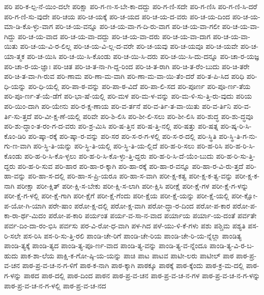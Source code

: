 {ಪರಿ
ಪರಿ-ಕ-ಲ್ಪ-ನೆ-ಯಿಂ-ದಲೇ
ಪರಿಕ್ಷಾ
ಪರಿ-ಗ-ಣ-ಸ-ಬೇ-ಕಾ-ದದ್ದು
ಪರಿ-ಗ-ಣಿ-ಸದೇ
ಪರಿ-ಗ-ಣಿಸಿ
ಪರಿ-ಗ-ಣಿ-ಸಿ-ದರೆ
ಪರಿ-ಗ-ಣಿ-ಸು-ವುದೇ
ಪರಿ-ಚಯ
ಪರಿ-ಚ-ಯಕ್ಕೆ
ಪರಿ-ಚ-ಯದ
ಪರಿ-ಚ-ಯ-ದ-ವರು
ಪರಿ-ಚ-ಯ-ದಿಂದ
ಪರಿ-ಚ-ಯ-ಮಾ-ಡಿ-ಕೊ-ಳ್ಳು-ವಾಗ
ಪರಿ-ಚ-ಯ-ವನ್ನೂ
ಪರಿ-ಚ-ಯ-ವಾ-ಗ-ದಿ-ರು-ವಾಗ
ಪರಿ-ಚ-ಯ-ವಾ-ಗಲೀ
ಪರಿ-ಚ-ಯ-ವಾ-ಗಿದ್ದು
ಪರಿ-ಚ-ಯ-ವಾದ
ಪರಿ-ಚ-ಯ-ವಾ-ದದ್ದು
ಪರಿ-ಚ-ಯ-ವಾ-ದರು
ಪರಿ-ಚ-ಯ-ವಾ-ದಾಗ
ಪರಿ-ಚ-ಯ-ವಾ-ಯಿತು
ಪರಿ-ಚ-ಯ-ವಿ-ರ-ಲಿಲ್ಲ
ಪರಿ-ಚ-ಯ-ವಿ-ಲ್ಲ-ದ-ವರೇ
ಪರಿ-ಚ-ಯವು
ಪರಿ-ಚ-ಯವೂ
ಪರಿ-ಚ-ಯವೇ
ಪರಿ-ಚ-ಯಾ-ತ್ಮಕ
ಪರಿ-ಚ-ಯಿಸಿ
ಪರಿ-ಚ-ಯಿ-ಸಿ-ಕೊಂಡು
ಪರಿ-ಚ-ಯಿ-ಸಿ-ದರು
ಪರಿ-ಚ-ಯಿ-ಸಿ-ದು-ದನ್ನೂ
ಪರಿ-ಚಾ-ರ-ಯಜ್ಞ
ಪರಿ-ಚಾ-ರ-ಯ-ಜ್ಞಾಃ
ಪರಿ-ಚಿತ
ಪರಿ-ಚಿ-ತ-ನಾ-ಗಿ-ದ್ದ-ರಿಂದ
ಪರಿ-ಚಿ-ತ-ರಾಗಿ
ಪರಿ-ಚಿ-ತ-ರೆಂ-ಬುದು
ಪರಿ-ಚಿ-ತರೇ
ಪರಿ-ಚಿ-ತ-ವಾ-ಗಿ-ರುವ
ಪರಿ-ಣಾಮ
ಪರಿ-ಣಾ-ಮ-ವಾಗಿ
ಪರಿ-ಣಾ-ಮ-ವಾ-ಯಿ-ತೆಂ-ದರೆ
ಪರಿ-ತ-ಪಿ-ಸಿದ
ಪರಿಧಿ
ಪರಿ-ಧಿ-ಯನ್ನು
ಪರಿ-ಧಿ-ಯಲ್ಲಿ
ಪರಿ-ಪಾ-ಠ-ವನ್ನು
ಪರಿ-ಪಾ-ಠ-ವಿದೆ
ಪರಿ-ಪಾ-ಲಿ-ಸದ
ಪರಿ-ಪೂರ್ಣ
ಪರಿ-ಪೂ-ರ್ಣ-ತೆಯ
ಪರಿ-ಪೂ-ರ್ಣ-ತೆ-ಯೆ-ಡೆಗೆ
ಪರಿ-ಭಾ-ಷೆ-ಯಲ್ಲಿ
ಪರಿ-ಮಳ
ಪರಿ-ಮ-ಳ-ವನ್ನು
ಪರಿ-ಮ-ಳಿ-ಸು-ತ್ತಿ-ರು-ವುದು
ಪರಿಯ
ಪರಿ-ಯಿಂ-ದಾಗಿ
ಪರಿ-ಯೇನು
ಪರಿ-ರ-ಕ್ಷ-ಣಾಯ
ಪರಿ-ವ-ರ್ತನೆ
ಪರಿ-ವ-ರ್ತಿ-ತ-ವಾ-ಯಿತು
ಪರಿ-ವ-ರ್ತಿನಿ
ಪರಿ-ವ-ರ್ತಿ-ಸು-ತ್ತದೆ
ಪರಿ-ವೀ-ಕ್ಷ-ಣೆ-ಯಲ್ಲಿ
ಪರಿವೇ
ಪರಿ-ಶಿ-ಲಿಸಿ
ಪರಿ-ಶೀ-ಲಿ-ಸಲು
ಪರಿ-ಶೀ-ಲಿಸಿ
ಪರಿ-ಶುದ್ಧ
ಪರಿ-ಶು-ದ್ಧವೂ
ಪರಿ-ಶು-ದ್ಧಾಂ-ತ-ರಂ-ಗ-ದ-ವರು
ಪರಿ-ಶ್ರ-ಮಿಸಿ
ಪರಿ-ಷ-ತ್ತಿನ
ಪರಿ-ಷ-ತ್ತಿ-ನಲ್ಲಿ
ಪರಿ-ಷತ್ತು
ಪರಿ-ಷತ್ನ
ಪರಿ-ಷ್ಕ-ರಿ-ಸಿ-ಕೊಂ-ಡಿರಿ
ಪರಿ-ಷ್ಕಾ-ರಕ್ಕೆ
ಪರಿ-ಷ್ಕಾ-ರ-ವನ್ನು
ಪರಿ-ಸರ
ಪರಿ-ಸ-ರ-ಗ-ಳಲ್ಲಿ
ಪರಿ-ಸ-ರ-ದಲ್ಲಿ
ಪರಿ-ಸ್ಥಿತಿ
ಪರಿ-ಸ್ಥಿ-ತಿ-ಗ-ನು-ಗು-ಣ-ವಾಗಿ
ಪರಿ-ಸ್ಥಿ-ತಿ-ಯನ್ನು
ಪರಿ-ಸ್ಥಿ-ತಿ-ಯಲ್ಲಿ
ಪರಿ-ಸ್ಥಿ-ತಿ-ಯ-ಲ್ಲಿದೆ
ಪರಿ-ಹ-ರಿ-ಸಲು
ಪರಿ-ಹ-ರಿಸಿ
ಪರಿ-ಹ-ರಿ-ಸಿ-ಕೊಂಡು
ಪರಿ-ಹ-ರಿ-ಸಿ-ಕೊ-ಳ್ಳಲು
ಪರಿ-ಹ-ರಿ-ಸಿ-ಕೊ-ಳ್ಳು-ತ್ತಿ-ದ್ದರು
ಪರಿ-ಹ-ರಿ-ಸಿ-ದೆ-ಯೆಂ-ಬುದು
ಪರಿ-ಹ-ರಿ-ಸು-ತ್ತಿ-ದ್ದರು
ಪರಿ-ಹ-ರಿ-ಸುವ
ಪರಿ-ಹಾರ
ಪರಿ-ಹಾ-ರ-ಕ್ಕಾಗಿ
ಪರಿ-ಹಾ-ರಕ್ಕೆ
ಪರಿ-ಹಾ-ರ-ವನ್ನೂ
ಪರಿ-ಹಾ-ರ-ವಿ-ರು-ತ್ತದೆ
ಪರಿ-ಹಾ-ವನ್ನು
ಪರಿ-ಹಾ-ಸ-ದಲ್ಲಿ
ಪರಿ-ಹಾ-ಸ-ಪ್ರಿ-ಯರೂ
ಪರಿ-ಹಾ-ಸ-ವಾಗಿ
ಪರೀ-ಕ್ಷ-ಕತ್ವ
ಪರೀ-ಕ್ಷ-ಕ-ತ್ವ-ವನ್ನು
ಪರೀ-ಕ್ಷ-ಕ-ನಾಗಿ
ಪರೀಕ್ಷಾ
ಪರೀ-ಕ್ಷಿತ್
ಪರೀ-ಕ್ಷಿ-ಸ-ಬೇಕು
ಪರೀ-ಕ್ಷಿ-ಸ-ಲಾಗಿ
ಪರೀ-ಕ್ಷಿಸಿ
ಪರೀಕ್ಷೆ
ಪರೀ-ಕ್ಷೆ-ಗಳ
ಪರೀ-ಕ್ಷೆ-ಗ-ಳನ್ನು
ಪರೀ-ಕ್ಷೆ-ಗ-ಳಲ್ಲಿ
ಪರೀ-ಕ್ಷೆ-ಗಾಗಿ
ಪರೀ-ಕ್ಷೆಗೆ
ಪರೀ-ಕ್ಷೆ-ಗೆಂದು
ಪರೀ-ಕ್ಷೆಯ
ಪರೀ-ಕ್ಷೆ-ಯನ್ನು
ಪರೀ-ಕ್ಷೆ-ಯಲ್ಲಿ
ಪರೀ-ಕ್ಷೋ-ಪ-ಯೋ-ಗಿ-ಯಾಗಿ
ಪರೇ-ಷಾಂ
ಪರೋ-ಕ್ಷ-ದಲ್ಲಿ
ಪರೋ-ಕ್ಷ-ವಾಗಿ
ಪರೋ-ದ್ಧಾ-ರ-ದಿಂದ
ಪರೋ-ಪ-ಕಾರ
ಪರೋ-ಪ-ಕಾ-ರಾ-ರ್ಥ-ಮಿದಂ
ಪರೋ-ಪ-ಕಾರಿ
ಪರ್ಯಂತ
ಪರ್ಯ-ವ-ಸಾ-ನ-ವಾದ
ಪರ್ಯಾಯ
ಪರ್ಯಾ-ಯ-ದಂತೆ
ಪರ್ವತೇ
ಪರ್ವ-ದಿಂ-ದಾ-ರಂ-ಭಿಸಿ
ಪರ್ವಸು
ಪರ-ವಿ-ರೋ-ಧ-ವಾಗಿ
ಪಳ-ಗಿದ
ಪಳೆ-ಯು-ಳಿ-ಕೆ-ಗಳು
ಪಶು
ಪಶ್ಚಿಮ
ಪಶ್ಯತಿ
ಪಸ-ರಿ-ಸಲೇ
ಪಸ-ರಿಸಿ
ಪಸ-ರಿ-ಸು-ತ್ತಿ-ರಲಿ
ಪಾಂಡಿ-ಚೇ-ರಿಗೆ
ಪಾಂಡಿ-ಚೇ-ರಿಯ
ಪಾಂಡಿ-ಚೇ-ರಿ-ಯ-ನ್ನೆಲ್ಲಾ
ಪಾಂಡಿತ್ಯ
ಪಾಂಡಿ-ತ್ಯಕ್ಕೆ
ಪಾಂಡಿ-ತ್ಯದ
ಪಾಂಡಿ-ತ್ಯ-ಪೂ-ರ್ಣ-ವಾದ
ಪಾಂಡಿ-ತ್ಯ-ವನ್ನು
ಪಾಂಡಿ-ತ್ಯ-ವ-ನ್ನೆಂದೂ
ಪಾಂಡಿ-ತ್ಯ-ವಿ-ರ-ಬ-ಹುದು
ಪಾಕ-ಶಾ-ಲೆಯ
ಪಾಕ್ಷಿ-ಕ-ಗೋ-ಷ್ಠಿ-ಯ-ಯನ್ನು
ಪಾಚಿ
ಪಾಟ
ಪಾಟವ
ಪಾಟೀ-ಲರು
ಪಾಟೀಲ್
ಪಾಠ
ಪಾಠ-ಪ್ರ-ವ-ಚನ
ಪಾಠ-ಪ್ರ-ವ-ಚ-ನ-ಗ-ಳಿಗೆ
ಪಾಠ-ಕ-ನಾಗಿ
ಪಾಠ-ಕ್ಕಾಗಿ
ಪಾಠಕ್ಕೂ
ಪಾಠಕ್ಕೆ
ಪಾಠ-ಕ್ಕೆಂದು
ಪಾಠ-ಕ್ರ-ಮ-ದಲ್ಲಿ
ಪಾಠ-ಗ-ಳನ್ನು
ಪಾಠದ
ಪಾಠ-ದಲ್ಲಿ
ಪಾಠ-ದಿಂದ
ಪಾಠನ
ಪಾಠ-ಪ್ರ-ವ-ಚನ
ಪಾಠ-ಪ್ರ-ವ-ಚ-ನ-ಗಳ
ಪಾಠ-ಪ್ರ-ವ-ಚ-ನ-ಗ-ಳನ್ನು
ಪಾಠ-ಪ್ರ-ವ-ಚ-ನ-ಗ-ಳಲ್ಲಿ
ಪಾಠ-ಪ್ರ-ವ-ಚ-ನದ
}
